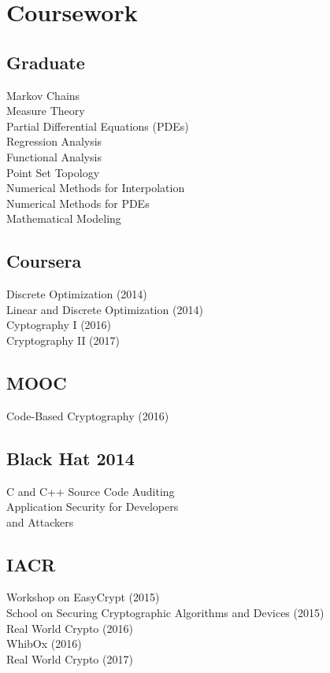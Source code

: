 \documentclass[letterpaper]{clinton-resume}
\begin{document}
\newpage%
\begin{minipage}[t]{0.33\textwidth}
\section{Coursework}
\subsection{Graduate}
Markov Chains\\
Measure Theory\\
Partial Differential Equations (PDEs)\\
Regression Analysis\\
Functional Analysis\\
Point Set Topology\\
Numerical Methods for Interpolation\\
Numerical Methods for PDEs\\
Mathematical Modeling\\
\subsection{Coursera}
Discrete Optimization (2014)\\
Linear and Discrete Optimization (2014)\\
Cyptography I (2016)\\
Cryptography II (2017)
\subsection{MOOC}
Code-Based Cryptography (2016)
\subsection{Black Hat 2014}
C and C++ Source Code Auditing\\
Application Security for Developers\\and Attackers\\
\subsection{IACR}
Workshop on EasyCrypt (2015)\\
School on Securing Cryptographic Algorithms and Devices (2015)\\
Real World Crypto (2016)\\
WhibOx (2016)\\
Real World Crypto (2017)\\

\end{minipage}
\end{document}
